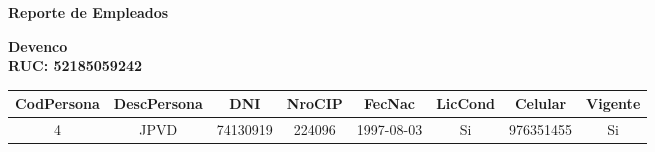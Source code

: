 \documentclass[a4paper, landscape]{article}
\begin{document}
\begin{center}
\textbf{\Large Reporte de Empleados}
\end{center}
\vspace{0.5cm}
\textbf{\Huge Devenco}\\ %
\vspace{0.2cm}
\textbf{\Large RUC: 52185059242}\\ %
\vspace{0.5cm}
\begin{longtable}{|c|c|c|c|c|c|c|c|}
\hline
CodPersona & DescPersona & DNI & NroCIP & FecNac & LicCond & Celular & Vigente \\
\hline
4 & JPVD & 74130919 & 224096 & 1997-08-03 & Si & 976351455 & Si \\
\hline
\end{longtable}
\end{document}
